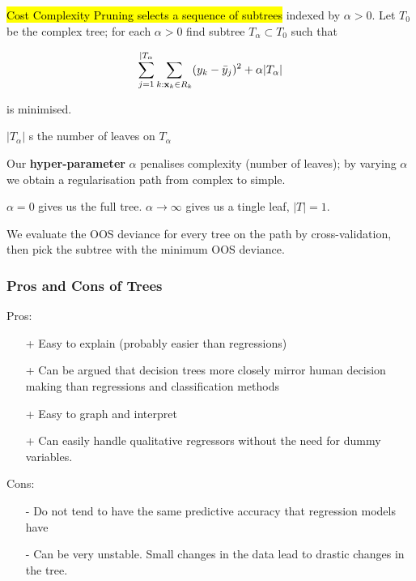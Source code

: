 \documentclass[11pt]{article}
\begin{document}
\begin{definition}
    \hl{Cost Complexity Pruning selects a sequence of subtrees} indexed by $\alpha>0$. Let $T_0$ be the complex tree; for each $\alpha>0$ find subtree $T_\alpha\subset T_0$ such that

    \begin{equation}
        \sum_{j=1}^{|T_\alpha}\sum_{k:\mathbf{x}_k\in R_k}(y_k - \Bar{y}_j)^2 + \alpha|T_\alpha|
    \end{equation}

    is minimised.

    \begin{note}
        $|T_\alpha|$ s the number of leaves on $T_\alpha$
    \end{note}

    Our \textbf{hyper-parameter} $\alpha$ penalises complexity (number of leaves); by varying $\alpha$ we obtain a regularisation path from complex to simple.

    \begin{note}
        $\alpha=0$ gives us the full tree. $\alpha\rightarrow\infty$ gives us a tingle leaf, $|T| = 1$.
    \end{note}

    We evaluate the OOS deviance for every tree on the path by cross-validation, then pick the subtree with the minimum OOS deviance.
\end{definition}



\subsubsection{Pros and Cons of Trees}

\begin{shaded}
    Pros:
    \begin{itemize}
        \item[+] Easy to explain (probably easier than regressions)
        \item[+] Can be argued that decision trees more closely mirror human decision making than regressions and classification methods
        \item[+] Easy to graph and interpret
        \item[+] Can easily handle qualitative regressors without the need for dummy variables.
    \end{itemize}

    Cons:
    \begin{itemize}
        \item[-] Do not tend to have the same predictive accuracy that regression models have 
        \item[-] Can be very unstable. Small changes in the data lead to drastic changes in the tree.
    \end{itemize}
\end{shaded}
\end{document}
